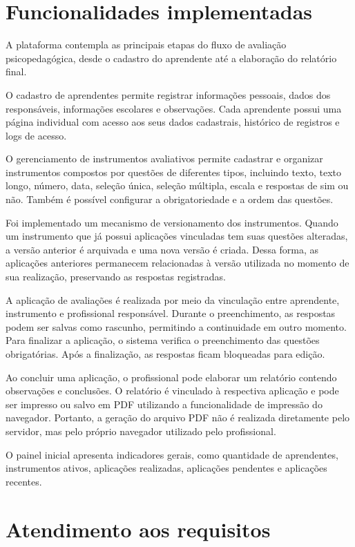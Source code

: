 \section{Funcionalidades implementadas}

A plataforma contempla as principais etapas do fluxo de avaliação psicopedagógica, desde o cadastro do aprendente até a elaboração do relatório final.

O cadastro de aprendentes permite registrar informações pessoais, dados dos responsáveis, informações escolares e observações. Cada aprendente possui uma página individual com acesso aos seus dados cadastrais, histórico de registros e logs de acesso.

O gerenciamento de instrumentos avaliativos permite cadastrar e organizar instrumentos compostos por questões de diferentes tipos, incluindo texto, texto longo, número, data, seleção única, seleção múltipla, escala e respostas de sim ou não. Também é possível configurar a obrigatoriedade e a ordem das questões.

Foi implementado um mecanismo de versionamento dos instrumentos. Quando um instrumento que já possui aplicações vinculadas tem suas questões alteradas, a versão anterior é arquivada e uma nova versão é criada. Dessa forma, as aplicações anteriores permanecem relacionadas à versão utilizada no momento de sua realização, preservando as respostas registradas.

A aplicação de avaliações é realizada por meio da vinculação entre aprendente, instrumento e profissional responsável. Durante o preenchimento, as respostas podem ser salvas como rascunho, permitindo a continuidade em outro momento. Para finalizar a aplicação, o sistema verifica o preenchimento das questões obrigatórias. Após a finalização, as respostas ficam bloqueadas para edição.

Ao concluir uma aplicação, o profissional pode elaborar um relatório contendo observações e conclusões. O relatório é vinculado à respectiva aplicação e pode ser impresso ou salvo em PDF utilizando a funcionalidade de impressão do navegador. Portanto, a geração do arquivo PDF não é realizada diretamente pelo servidor, mas pelo próprio navegador utilizado pelo profissional.

O painel inicial apresenta indicadores gerais, como quantidade de aprendentes, instrumentos ativos, aplicações realizadas, aplicações pendentes e aplicações recentes.

\section{Atendimento aos requisitos}

